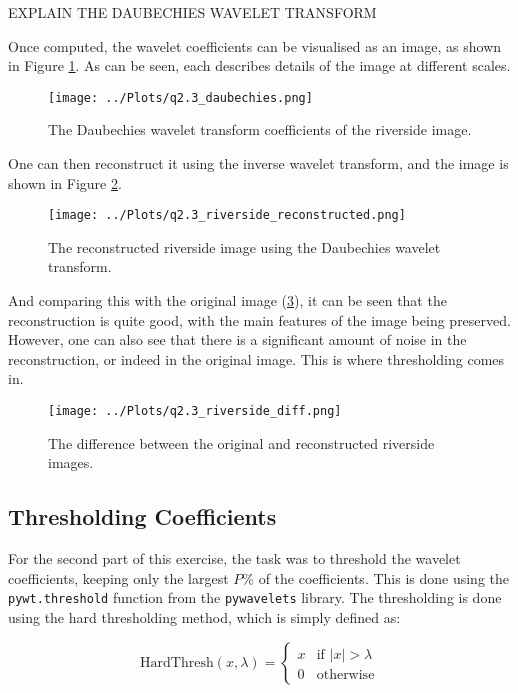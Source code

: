 \documentclass[12pt]{report} %
\begin{document}
EXPLAIN THE DAUBECHIES WAVELET TRANSFORM

Once computed, the wavelet coefficients can be visualised as an image, as shown in Figure \ref{fig:wavelet_coefficients}. As can be seen, each describes details of the image at different scales.

\begin{figure}[htbp]
    \centering
    \texttt{[image: ../Plots/q2.3\_daubechies.png]}
    \caption{The Daubechies wavelet transform coefficients of the riverside image.}
    \label{fig:wavelet_coefficients}
\end{figure}

One can then reconstruct it using the inverse wavelet transform, and the image is shown in Figure \ref{fig:reconstructed_image}.

\begin{figure}[htbp]
    \centering
    \texttt{[image: ../Plots/q2.3\_riverside\_reconstructed.png]}
    \caption{The reconstructed riverside image using the Daubechies wavelet transform.}
    \label{fig:reconstructed_image}
\end{figure}

And comparing this with the original image (\ref{fig:diff_image}), it can be seen that the reconstruction is quite good, with the main features of the image being preserved. However, one can also see that there is a significant amount of noise in the reconstruction, or indeed in the original image. This is where thresholding comes in.

\begin{figure}[htbp]
    \centering
    \texttt{[image: ../Plots/q2.3\_riverside\_diff.png]}
    \caption{The difference between the original and reconstructed riverside images.}
    \label{fig:diff_image}
\end{figure}

\subsection{Thresholding Coefficients}

For the second part of this exercise, the task was to threshold the wavelet coefficients, keeping only the largest $P$\% of the coefficients. This is done using the \texttt{pywt.threshold} function from the \texttt{pywavelets} library. The thresholding is done using the hard thresholding method, which is simply defined as:

\begin{equation}
    \text{HardThresh}(x, \lambda) =
    \begin{cases}
        x & \text{if } |x| > \lambda \\
        0 & \text{otherwise}
    \end{cases}
\end{equation}
\end{document}
